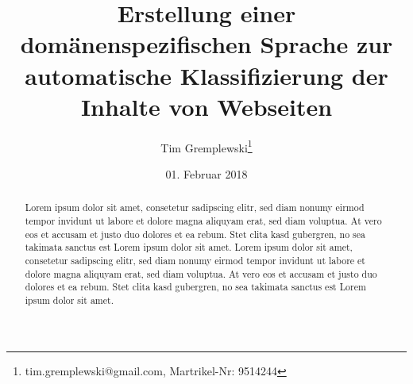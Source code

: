 \documentclass[abstract=on,parskip=half,titlepage,twoside,openright]{scrreprt}
\title{Erstellung einer domänenspezifischen Sprache zur automatische Klassifizierung der Inhalte von Webseiten}
\author{Tim Gremplewski\thanks{tim.gremplewski@gmail.com, Martrikel-Nr: 9514244}}
\date{01. Februar 2018}
\begin{document}
	\maketitle

	\begin{abstract}
		Lorem ipsum dolor sit amet, consetetur sadipscing elitr, sed diam nonumy eirmod tempor invidunt ut labore et dolore magna aliquyam erat, sed diam voluptua. At vero eos et accusam et justo duo dolores et ea rebum. Stet clita kasd gubergren, no sea takimata sanctus est Lorem ipsum dolor sit amet. Lorem ipsum dolor sit amet, consetetur sadipscing elitr, sed diam nonumy eirmod tempor invidunt ut labore et dolore magna aliquyam erat, sed diam voluptua. At vero eos et accusam et justo duo dolores et ea rebum. Stet clita kasd gubergren, no sea takimata sanctus est Lorem ipsum dolor sit amet.
	\end{abstract}

	\newpage

	\begingroup
		\let\clearpage\relax
		\tableofcontents
		\listoffigures
		\lstlistoflistings
	\endgroup

	\newpage

	
	
	
	
	
	
	

	\sloppy
	\printbibliography[heading=bibintoc]
\end{document}

